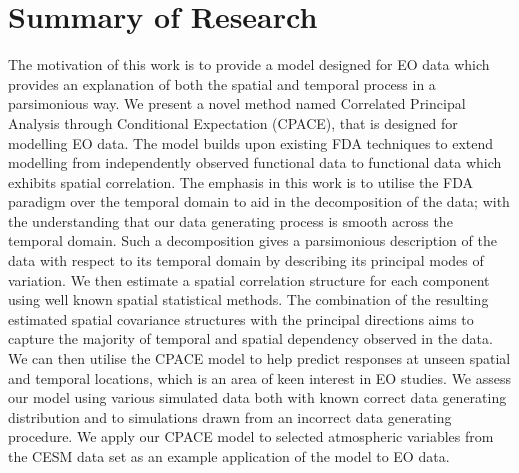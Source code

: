\section{\label{sec:summary_research}Summary of Research}
The motivation of this work is to provide a model designed for EO data which provides an explanation of both the spatial and temporal process in a parsimonious way.
We present a novel method named Correlated Principal Analysis through Conditional Expectation (CPACE), that is designed for modelling EO data.
The model builds upon existing FDA techniques to extend modelling from independently observed functional data to functional data which exhibits spatial correlation.
The emphasis in this work is to utilise the FDA paradigm over the temporal domain to aid in the decomposition of the data; with the understanding that our data generating process is smooth across the temporal domain.
Such a decomposition gives a parsimonious description of the data with respect to its temporal domain by describing its principal modes of variation.
We then estimate a spatial correlation structure for each component using well known spatial statistical methods.
The combination of the resulting estimated spatial covariance structures with the principal directions aims to capture the majority of temporal and spatial dependency observed in the data.
We can then utilise the CPACE model to help predict responses at unseen spatial and temporal locations, which is an area of keen interest in EO studies.
We assess our model using various simulated data both with known correct data generating distribution and to simulations drawn from an incorrect data generating procedure.
We apply our CPACE model to selected atmospheric variables from the CESM data set as an example application of the model to EO data.

